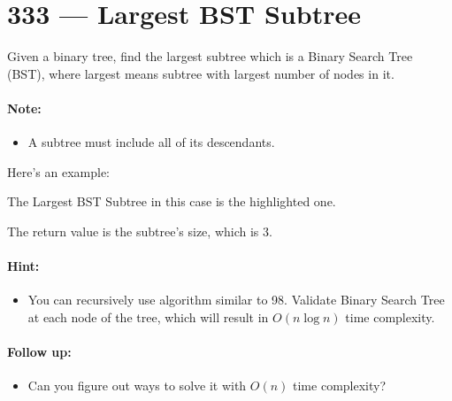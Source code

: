 \section{333 --- Largest BST Subtree}
Given a binary tree, find the largest subtree which is a Binary Search Tree (BST), where largest means subtree with largest number of nodes in it.
\paragraph{Note:}
\begin{itemize}
    \item A subtree must include all of its descendants. 
\end{itemize}
\par
Here's an example:
\begin{figure}[H]
\end{figure}
The Largest BST Subtree in this case is the highlighted one. 
\par
The return value is the subtree's size, which is 3.

\paragraph{Hint:}
\begin{itemize}
    \item You can recursively use algorithm similar to 98. Validate Binary Search Tree at each node of the tree, which will result in $O(n\log n)$ time complexity.
\end{itemize}

\paragraph{Follow up:}
\begin{itemize}
    \item Can you figure out ways to solve it with $O(n)$ time complexity?
\end{itemize}

